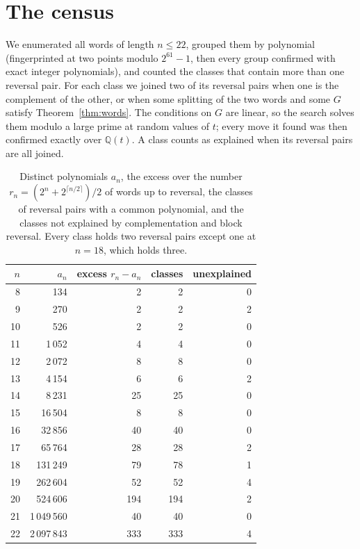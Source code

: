 \documentclass[11pt]{article}
\theoremstyle{remark}
\begin{document}
\section{The census}

We enumerated all words of length $n\le22$, grouped them by polynomial (fingerprinted at two points modulo
$2^{61}-1$, then every group confirmed with exact integer polynomials), and counted the classes that contain more
than one reversal pair. For each class we joined two of its reversal pairs when one is the complement of the other,
or when some splitting of the two words and some $G$ satisfy Theorem~\ref{thm:words}. The conditions on $G$ are
linear, so the search solves them modulo a large prime at random values of $t$; every move it found was then
confirmed exactly over $\mathbb{Q}(t)$. A class counts as explained when its reversal pairs are all joined.

\begin{table}[ht]
\centering
\small
\begin{tabular}{rrrrr}
\toprule
$n$ & $a_n$ & excess $r_n-a_n$ & classes & unexplained \\
\midrule
8 & 134 & 2 & 2 & 0 \\
9 & 270 & 2 & 2 & 2 \\
10 & 526 & 2 & 2 & 0 \\
11 & 1\,052 & 4 & 4 & 0 \\
12 & 2\,072 & 8 & 8 & 0 \\
13 & 4\,154 & 6 & 6 & 2 \\
14 & 8\,231 & 25 & 25 & 0 \\
15 & 16\,504 & 8 & 8 & 0 \\
16 & 32\,856 & 40 & 40 & 0 \\
17 & 65\,764 & 28 & 28 & 2 \\
18 & 131\,249 & 79 & 78 & 1 \\
19 & 262\,604 & 52 & 52 & 4 \\
20 & 524\,606 & 194 & 194 & 2 \\
21 & 1\,049\,560 & 40 & 40 & 0 \\
22 & 2\,097\,843 & 333 & 333 & 4 \\
\bottomrule
\end{tabular}
\caption{Distinct polynomials $a_n$, the excess over the number $r_n=(2^n+2^{\lceil n/2\rceil})/2$ of words up to
reversal, the classes of reversal pairs with a common polynomial, and the classes not explained by complementation
and block reversal. Every class holds two reversal pairs except one at $n=18$, which holds three.}
\label{tab:census}
\end{table}
\end{document}
